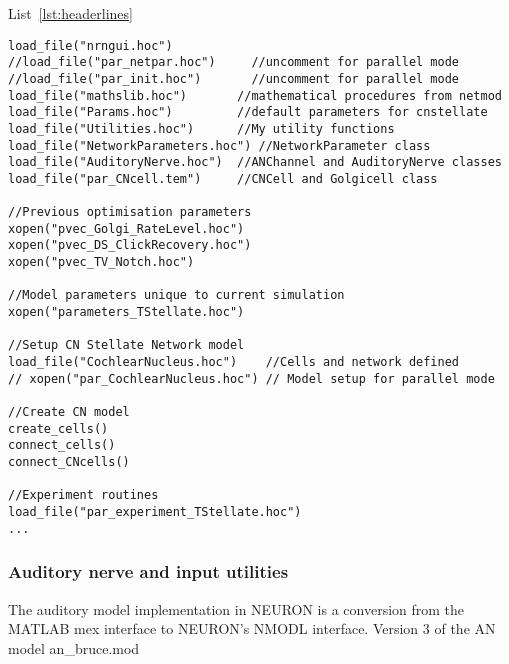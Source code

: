 List~\ref{lst:headerlines}
\begin{lstlisting}[label=lst:headerlines,caption={Headerlines in \mbox{\textsf{TStellate\.hoc}} show a typical setup in a \textsf{cnstellate} simulation or optimisation file.}]
load_file("nrngui.hoc")
//load_file("par_netpar.hoc")     //uncomment for parallel mode
//load_file("par_init.hoc")       //uncomment for parallel mode
load_file("mathslib.hoc")       //mathematical procedures from netmod
load_file("Params.hoc")         //default parameters for cnstellate
load_file("Utilities.hoc")      //My utility functions
load_file("NetworkParameters.hoc") //NetworkParameter class
load_file("AuditoryNerve.hoc")  //ANChannel and AuditoryNerve classes
load_file("par_CNcell.tem")     //CNCell and Golgicell class

//Previous optimisation parameters
xopen("pvec_Golgi_RateLevel.hoc")
xopen("pvec_DS_ClickRecovery.hoc")
xopen("pvec_TV_Notch.hoc")

//Model parameters unique to current simulation
xopen("parameters_TStellate.hoc")

//Setup CN Stellate Network model
load_file("CochlearNucleus.hoc")    //Cells and network defined
// xopen("par_CochlearNucleus.hoc") // Model setup for parallel mode

//Create CN model
create_cells()
connect_cells()
connect_CNcells()

//Experiment routines
load_file("par_experiment_TStellate.hoc")
...
\end{lstlisting}




\subsubsection{Auditory nerve and input utilities} \label{sec:APDX:auditory-nerve-input}

The auditory model implementation in NEURON is a conversion from the MATLAB mex
interface to NEURON's NMODL interface. Version 3 of the AN model
\mbox{\textsf{an\_bruce.mod}}

